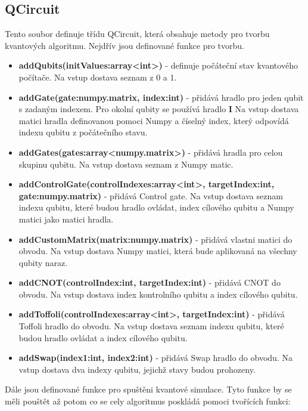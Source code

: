 \documentclass[11pt]{article}
\begin{document}
\subsection{QCircuit}
Tento soubor definuje třídu QCircuit, která obsahuje metody pro tvorbu kvantových algoritmu.
Nejdřív jsou definované funkce pro tvorbu.
\begin{itemize}
    \item \textbf{addQubits(initValues:array<int>)} - definuje počáteční stav kvantového počítače.
          Na vstup dostava seznam z 0 a 1.
    \item \textbf{addGate(gate:numpy.matrix, index:int)} - přidává hradlo pro jeden qubit s zadaným indexem.
          Pro okolní qubity se používá hradlo \textbf{I}
          Na vstup dostava matici hradla definovanou pomoci Numpy a číselný index, který odpovídá indexu qubitu z počátečního stavu.
    \item \textbf{addGates(gates:array<numpy.matrix>)} - přidává hradla pro celou skupinu qubitu.
          Na vstup dostava seznam z Numpy matic.
    \item \textbf{addControlGate(controlIndexes:array<int>, targetIndex:int, gate:numpy.matrix)} - přidává Control gate.
          Na vstup dostava seznam indexu qubitu, které budou hradlo ovládat, index cílového qubitu a Numpy matici jako matici hradla.
    \item \textbf{addCustomMatrix(matrix:numpy.matrix)} - přidává vlastni matici do obvodu.
          Na vstup dostava Numpy matici, která bude aplikovaná na všechny qubity naraz.
    \item \textbf{addCNOT(controlIndex:int, targetIndex:int)} - přidává CNOT do obvodu.
          Na vstup dostava index kontrolního qubitu a index cílového qubitu.
    \item \textbf{addToffoli(controlIndexes:array<int>, targetIndex:int)} - přidává Toffoli hradlo do obvodu.
          Na vstup dostava seznam indexu qubitu, které budou hradlo ovládat a index cílového qubitu.
    \item \textbf{addSwap(index1:int, index2:int)} - přidává Swap hradlo do obvodu.
          Na vstup dostava dva indexy qubitu, jejichž stavy budou prohozeny.
\end{itemize}
\par Dále jsou definované funkce pro spuštěni kvantové simulace.
Tyto funkce by se měli pouštět až potom co se cely algoritmus poskládá pomoci tvořících funkci:
\end{document}
